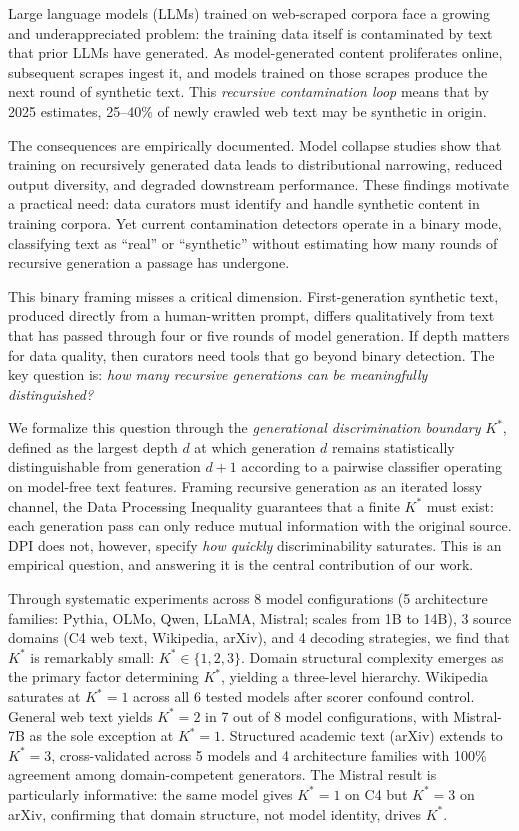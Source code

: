 \documentclass[11pt]{article}
\begin{document}
Large language models (LLMs) trained on web-scraped corpora face a growing and underappreciated problem: the training data itself is contaminated by text that prior LLMs have generated. As model-generated content proliferates online, subsequent scrapes ingest it, and models trained on those scrapes produce the next round of synthetic text. This \emph{recursive contamination loop} means that by 2025 estimates, 25--40\% of newly crawled web text may be synthetic in origin.

The consequences are empirically documented. Model collapse studies show that training on recursively generated data leads to distributional narrowing, reduced output diversity, and degraded downstream performance. These findings motivate a practical need: data curators must identify and handle synthetic content in training corpora. Yet current contamination detectors operate in a binary mode, classifying text as ``real'' or ``synthetic'' without estimating how many rounds of recursive generation a passage has undergone.

This binary framing misses a critical dimension. First-generation synthetic text, produced directly from a human-written prompt, differs qualitatively from text that has passed through four or five rounds of model generation. If depth matters for data quality, then curators need tools that go beyond binary detection. The key question is: \emph{how many recursive generations can be meaningfully distinguished?}

We formalize this question through the \emph{generational discrimination boundary} $K^*$, defined as the largest depth $d$ at which generation $d$ remains statistically distinguishable from generation $d{+}1$ according to a pairwise classifier operating on model-free text features. Framing recursive generation as an iterated lossy channel, the Data Processing Inequality guarantees that a finite $K^*$ must exist: each generation pass can only reduce mutual information with the original source. DPI does not, however, specify \emph{how quickly} discriminability saturates. This is an empirical question, and answering it is the central contribution of our work.

Through systematic experiments across 8 model configurations (5 architecture families: Pythia, OLMo, Qwen, LLaMA, Mistral; scales from 1B to 14B), 3 source domains (C4 web text, Wikipedia, arXiv), and 4 decoding strategies, we find that $K^*$ is remarkably small: $K^* \in \{1, 2, 3\}$. Domain structural complexity emerges as the primary factor determining $K^*$, yielding a three-level hierarchy. Wikipedia saturates at $K^*{=}1$ across all 6 tested models after scorer confound control. General web text yields $K^*{=}2$ in 7 out of 8 model configurations, with Mistral-7B as the sole exception at $K^*{=}1$. Structured academic text (arXiv) extends to $K^*{=}3$, cross-validated across 5 models and 4 architecture families with 100\% agreement among domain-competent generators. The Mistral result is particularly informative: the same model gives $K^*{=}1$ on C4 but $K^*{=}3$ on arXiv, confirming that domain structure, not model identity, drives $K^*$.
\end{document}
